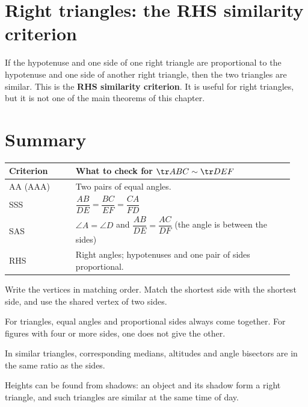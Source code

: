 \section{Right triangles: the RHS similarity criterion}

If the hypotenuse and one side of one right triangle are proportional to the hypotenuse and one side of another right triangle, then the two triangles are similar. This is the \textbf{RHS similarity criterion}. It is useful for right triangles, but it is not one of the main theorems of this chapter.

\section{Summary}

\begin{center}
\renewcommand{\arraystretch}{1.9}
\begin{tabular}{@{}p{0.22\linewidth}p{0.72\linewidth}@{}}
\hline
\textbf{Criterion} & \textbf{What to check for $\tr ABC\sim\tr DEF$} \\
\hline
AA (AAA) & Two pairs of equal angles. \\
SSS & $\dfrac{AB}{DE}=\dfrac{BC}{EF}=\dfrac{CA}{FD}$ \\
SAS & $\angle A=\angle D$ and $\dfrac{AB}{DE}=\dfrac{AC}{DF}$ (the angle is between the sides) \\
RHS & Right angles; hypotenuses and one pair of sides proportional. \\
\hline
\end{tabular}
\end{center}

\begin{steps}
  \item Write the vertices in matching order. Match the shortest side with the shortest side, and use the shared vertex of two sides.
  \item For triangles, equal angles and proportional sides always come together. For figures with four or more sides, one does not give the other.
  \item In similar triangles, corresponding medians, altitudes and angle bisectors are in the same ratio as the sides.
  \item Heights can be found from shadows: an object and its shadow form a right triangle, and such triangles are similar at the same time of day.
\end{steps}
